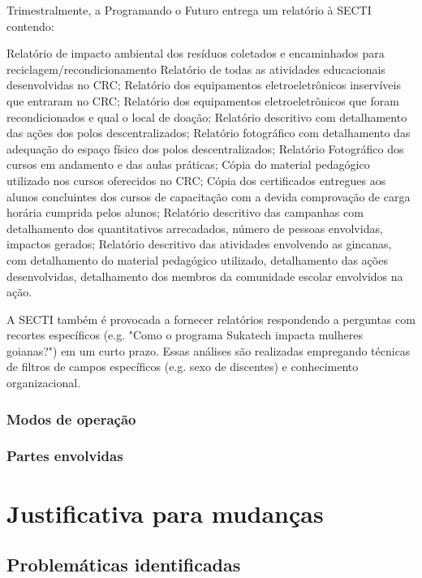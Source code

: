 \documentclass[
	12pt,				%
	openright,			%
	twoside,			%
	a4paper,			%
	english,			%
	french,				%
	spanish,			%
	brazil,				%
	]{abntex2}
\begin{document}
Trimestralmente, a Programando o Futuro entrega um relatório à SECTI contendo:

    Relatório de impacto ambiental dos resíduos coletados e encaminhados para reciclagem/recondicionamento
    Relatório de todas as atividades educacionais desenvolvidas no CRC;
    Relatório dos equipamentos eletroeletrônicos inservíveis que entraram no CRC;
    Relatório dos equipamentos eletroeletrônicos que foram recondicionados e qual o local de doação;
    Relatório descritivo com detalhamento das ações dos polos descentralizados;
    Relatório fotográfico com detalhamento das adequação do espaço físico dos polos descentralizados;
    Relatório Fotográfico dos cursos em andamento e das aulas práticas;
    Cópia do material pedagógico utilizado nos cursos oferecidos no CRC;
    Cópia dos certificados entregues aos alunos concluintes dos cursos de capacitação com a devida comprovação de carga horária cumprida pelos alunos;
    Relatório descritivo das campanhas com detalhamento dos quantitativos arrecadados, número de pessoas envolvidas, impactos gerados;
    Relatório descritivo das atividades envolvendo as gincanas, com detalhamento do material pedagógico utilizado, detalhamento das ações desenvolvidas, detalhamento dos membros da comunidade escolar envolvidos na ação.

A SECTI também é provocada a fornecer relatórios respondendo a perguntas com recortes específicos (e.g. "Como o programa Sukatech impacta mulheres goianas?") em um curto prazo. Essas análises são realizadas empregando técnicas de filtros de campos específicos (e.g. sexo de discentes) e conhecimento organizacional.

\section{Modos de operação}

\section{Partes envolvidas}


\part{Justificativa para mudanças}

\chapter{Problemáticas identificadas}
\end{document}
